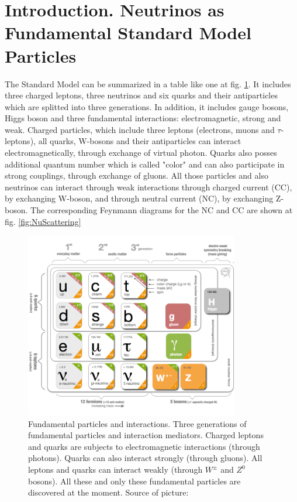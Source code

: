\section{Introduction. Neutrinos as Fundamental Standard Model Particles}

The Standard Model can be summarized in a table like one at fig. \ref{fig:StandardModel}. It includes three charged leptons, three neutrinos and six quarks and their antiparticles which are splitted into three generations. In addition, it includes gauge bosons, Higgs boson and three fundamental interactions: electromagnetic, strong and weak. Charged particles, which include three leptons (electrons, muons and $\tau$-leptons), all quarks, W-bosons and their antiparticles can interact electromagnetically, through exchange of virtual photon. Quarks also posses additional quantum number which is called "color" and can also participate in strong couplings, through exchange of gluons. All those particles and also neutrinos can interact through weak interactions through charged current (CC), by exchanging W-boson, and through neutral current (NC), by exchanging Z-boson. The corresponding Feynmann diagrams for the NC and CC are shown at fig. \ref{fig:NuScattering}\\

\begin{figure}
\caption{Fundamental particles and interactions. Three generations of fundamental particles and interaction mediators. Charged leptons and quarks are subjects to electromagnetic interactions (through photons). Quarks can also interact strongly (through gluons). All leptons and quarks can interact weakly (through $W^{\pm}$ and $Z^0$ bosons). All these and only these fundamental particles are discovered at the moment. Source of picture: \cite{ref_fig_StandardModel}}
\label{fig:StandardModel}
\centering 
\includegraphics[width=0.83\textwidth, keepaspectratio=true]{figs/StandardModel.png}
\end{figure}

